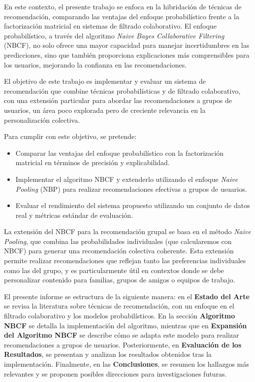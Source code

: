 \documentclass[runningheads,a4paper]{llncs}
\begin{document}
En este contexto, el presente trabajo se enfoca en la hibridación de técnicas de recomendación, comparando las ventajas del enfoque probabilístico frente a la factorización matricial en sistemas de filtrado colaborativo. El enfoque probabilístico, a través del algoritmo \textit{Naive Bayes Collaborative Filtering} (NBCF), no solo ofrece una mayor capacidad para manejar incertidumbres en las predicciones, sino que también proporciona explicaciones más comprensibles para los usuarios, mejorando la confianza en las recomendaciones. 

El objetivo de este trabajo es implementar y evaluar un sistema de recomendación que combine técnicas probabilísticas y de filtrado colaborativo, con una extensión particular para abordar las recomendaciones a grupos de usuarios, un área poco explorada pero de creciente relevancia en la personalización colectiva.

Para cumplir con este objetivo, se pretende:
\begin{itemize}
    \item Comparar las ventajas del enfoque probabilístico con la factorización matricial en términos de precisión y explicabilidad.
    \item Implementar el algoritmo NBCF y extenderlo utilizando el enfoque \textit{Naive Pooling} (NBP) para realizar recomendaciones efectivas a grupos de usuarios.
    \item Evaluar el rendimiento del sistema propuesto utilizando un conjunto de datos real y métricas estándar de evaluación.
\end{itemize}

La extensión del NBCF para la recomendación grupal 
se basa en el método \textit{Naive Pooling}, 
que combina las probabilidades individuales (que calcularemos 
con NBCF) para generar una recomendación colectiva coherente. Esta extensión permite realizar recomendaciones que reflejan tanto las preferencias individuales como las del grupo, y es particularmente útil en contextos donde se debe personalizar contenido para familias, grupos de amigos o equipos de trabajo.

El presente informe se estructura de la siguiente manera: en el \textbf{Estado del Arte} se revisa la literatura sobre técnicas de recomendación, con un enfoque en el filtrado colaborativo y los modelos probabilísticos. En la sección \textbf{Algoritmo NBCF} se detalla la implementación del algoritmo, mientras que en \textbf{Expansión del Algoritmo NBCF} se describe cómo se adapta este modelo para realizar recomendaciones a grupos de usuarios. Posteriormente, en \textbf{Evaluación de los Resultados}, se presentan y analizan los resultados obtenidos tras la implementación. Finalmente, en las \textbf{Conclusiones}, se resumen los hallazgos más relevantes y se proponen posibles direcciones para investigaciones futuras.
\end{document}
